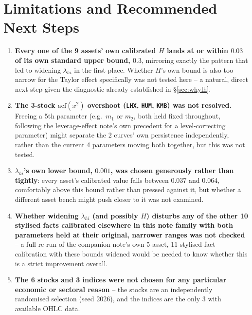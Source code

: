 \documentclass[11pt]{article}
\begin{document}
\section{Limitations and Recommended Next Steps}
\begin{enumerate}
\item \textbf{Every one of the 9 assets' own calibrated $H$ lands at or
within $0.03$ of its own standard upper bound, $0.3$}, mirroring exactly the
pattern that led to widening $\lambda_{hi}$ in the first place. Whether $H$'s
own bound is also too narrow for the Taylor effect specifically was not
tested here -- a natural, direct next step given the diagnostic already
established in \S\ref{sec:whylh}.
\item \textbf{The 3-stock $\text{acf}(x^2)$ overshoot (\texttt{LHX},
\texttt{HUM}, \texttt{KMB}) was not resolved.} Freeing a 5th parameter (e.g.\
$m_1$ or $m_2$, both held fixed throughout, following the leverage-effect
note's own precedent for a level-correcting parameter) might separate the
2 curves' own persistence independently, rather than the current 4
parameters moving both together, but this was not tested.
\item \textbf{$\lambda_{hi}$'s own lower bound, $0.001$, was chosen
generously rather than tightly}: every asset's calibrated value falls
between $0.037$ and $0.064$, comfortably above this bound rather than pressed
against it, but whether a different asset bench might push closer to it was
not examined.
\item \textbf{Whether widening $\lambda_{hi}$ (and possibly $H$) disturbs any
of the other 10 stylised facts calibrated elsewhere in this note family with
both parameters held at their original, narrower ranges was not checked} --
a full re-run of the companion note's own 5-asset, 11-stylised-fact
calibration with these bounds widened would be needed to know whether this is
a strict improvement overall.
\item \textbf{The 6 stocks and 3 indices were not chosen for any particular
economic or sectoral reason} -- the stocks are an independently randomised
selection (seed 2026), and the indices are the only 3 with available OHLC
data.
\end{enumerate}
\end{document}
